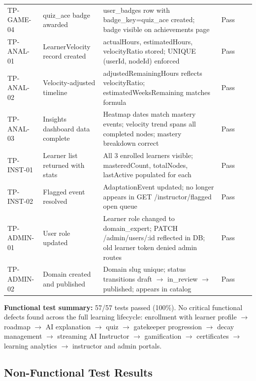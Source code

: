 \begin{longtable}{p{1.8cm}p{2.5cm}p{2.5cm}p{3cm}p{1.2cm}p{2.5cm}}
TP-GAME-04 & quiz\_ace badge awarded & user\_badges row with badge\_key=quiz\_ace created; badge visible on achievements page & Pass & \\
TP-ANAL-01 & LearnerVelocity record created & actualHours, estimatedHours, velocityRatio stored; UNIQUE (userId, nodeId) enforced & Pass & \\
TP-ANAL-02 & Velocity-adjusted timeline & adjustedRemainingHours reflects velocityRatio; estimatedWeeksRemaining matches formula & Pass & \\
TP-ANAL-03 & Insights dashboard data complete & Heatmap dates match mastery events; velocity trend spans all completed nodes; mastery breakdown correct & Pass & \\
TP-INST-01 & Learner list returned with stats & All 3 enrolled learners visible; masteredCount, totalNodes, lastActive populated for each & Pass & \\
TP-INST-02 & Flagged event resolved & AdaptationEvent updated; no longer appears in GET /instructor/flagged open queue & Pass & \\
TP-ADMIN-01 & User role updated & Learner role changed to domain\_expert; PATCH /admin/users/:id reflected in DB; old learner token denied admin routes & Pass & \\
TP-ADMIN-02 & Domain created and published & Domain slug unique; status transitions draft $\rightarrow$ in\_review $\rightarrow$ published; appears in catalog & Pass & \\
\bottomrule
\end{longtable}

\textbf{Functional test summary:} 57/57 tests passed (100\%). No critical functional defects found across the full learning lifecycle: enrollment with learner profile $\rightarrow$ roadmap $\rightarrow$ AI explanation $\rightarrow$ quiz $\rightarrow$ gatekeeper progression $\rightarrow$ decay management $\rightarrow$ streaming AI Instructor $\rightarrow$ gamification $\rightarrow$ certificates $\rightarrow$ learning analytics $\rightarrow$ instructor and admin portals.

\subsection{Non-Functional Test Results}

